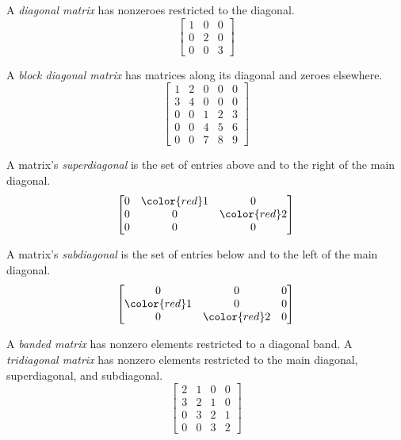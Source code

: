 A \textit{diagonal matrix} has nonzeroes restricted to the diagonal.
\begin{equation*}
  \begin{bmatrix}
    1 & 0 & 0 \\
    0 & 2 & 0 \\
    0 & 0 & 3
  \end{bmatrix}
\end{equation*}

A \textit{block diagonal matrix} has matrices along its diagonal and zeroes
elsewhere.
\begin{equation*}
  \begin{bmatrix}
    1 & 2 & 0 & 0 & 0 \\
    3 & 4 & 0 & 0 & 0 \\
    0 & 0 & 1 & 2 & 3 \\
    0 & 0 & 4 & 5 & 6 \\
    0 & 0 & 7 & 8 & 9
  \end{bmatrix}
\end{equation*}

A matrix's \textit{superdiagonal} is the set of entries above and to the right
of the main diagonal.
\begin{equation*}
  \begin{bmatrix}
    0 & {\color{red}1} & 0 \\
    0 & 0 & {\color{red}2} \\
    0 & 0 & 0
  \end{bmatrix}
\end{equation*}

A matrix's \textit{subdiagonal} is the set of entries below and to the left of
the main diagonal.
\begin{equation*}
  \begin{bmatrix}
    0 & 0 & 0 \\
    {\color{red}1} & 0 & 0 \\
    0 & {\color{red}2} & 0
  \end{bmatrix}
\end{equation*}

A \textit{banded matrix} has nonzero elements restricted to a diagonal band. A
\textit{tridiagonal matrix} has nonzero elements restricted to the main
diagonal, superdiagonal, and subdiagonal.
\begin{equation*}
  \begin{bmatrix}
    2 & 1 & 0 & 0 \\
    3 & 2 & 1 & 0 \\
    0 & 3 & 2 & 1 \\
    0 & 0 & 3 & 2
  \end{bmatrix}
\end{equation*}

